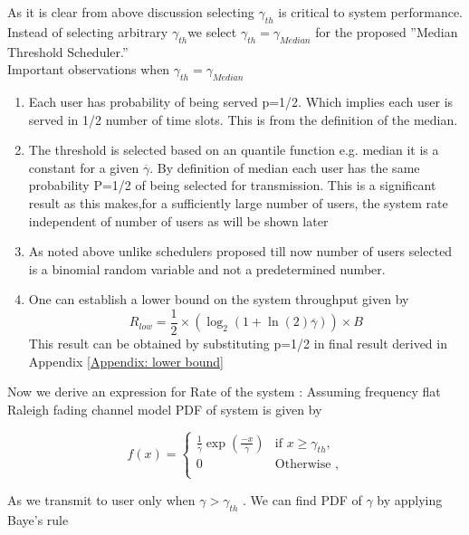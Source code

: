 \documentclass[conference]{IEEEtran}
\begin{document}
As it is clear from above discussion selecting ${{\gamma }_{th}}$ is critical to system performance. Instead of selecting arbitrary ${{\gamma }_{th}}$we select ${{\gamma }_{th}}={{\gamma }_{Median}}$ for the proposed ''Median Threshold Scheduler.''\\
Important observations when ${{\gamma }_{th}}={{\gamma }_{Median}}$\\
\begin{enumerate}
\item Each user has probability of being served p=1/2. Which implies each user is served in 1/2 number of time slots. This is from the definition of the median.
\item The threshold is selected based on an quantile function e.g. median it is a constant for a given  $\overline{\gamma }$. By definition of median each user has the same probability P=1/2 of being selected for transmission. This is a significant result as this makes,for a sufficiently large number of users, the system rate independent of number of users as will be shown later
\item As noted above unlike schedulers proposed till now number of users selected is a binomial random variable and not a predetermined number.
\item One can establish a lower bound on the system throughput given by 
\[{{R}_{low }}=\frac{1}{2}\times \left( {{\log }_{2}}(1+\ln (2)\overline{\gamma }) \right)\times B\]
This result can be obtained by substituting p=1/2 in final result derived in 
 Appendix \ref{Appendix: lower bound}
\end{enumerate}
 


Now we derive an expression for Rate of the system :
Assuming frequency flat Raleigh fading channel model PDF of system is given by \cite{Knoop_and_Humblet} 

\begin{equation}
f(x) =
\begin{cases}
\frac{1}{\overline{\gamma }}\exp \left( \frac{-x}{\overline{\gamma }} \right) & \text{if } x\ge {{\gamma }_{th}},\\
0 & \text{Otherwise } ,\\

\end{cases}
\end{equation}
	
 
As we transmit to user only when $\gamma >{{\gamma }_{th}}$ . We can find PDF of $\gamma$ by applying Baye’s rule
 
\end{document}
